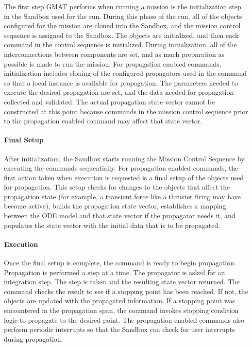\documentclass[10pt]{article}
\begin{document}
The first step GMAT performs when running a mission is the initialization step in the Sandbox used
for the run.  During this phase of the run, all of the objects configured for the mission are cloned
into the Sandbox, and the mission control sequence is assigned to the Sandbox.  The objects are
initialized, and then each command in the control sequence is initialized.  During initialization,
all of the interconnections between components are set, and as much preparation as possible is made
to run the mission.  For propagation enabled commands, initialization includes cloning of the
configured propagators used in the command so that a local instance is available for propagation.
The parameters needed to execute the desired propagation are set, and the data needed for
propagation collected and validated.  The actual propagation state vector cannot be constructed at
this point because commands in the mission control sequence prior to the propagation enabled command
may affect that state vector.

\paragraph{Final Setup}

After initialization, the Sandbox starts running the Mission Control Sequence by executing the
commands sequentially.  For propagation enabled commands, the first action taken when execution is
requested is a final setup of the objects used for propagation.  This setup checks for changes to
the objects that affect the propagation state (for example, a transient force like a thruster firing
may have become active), builds the propagation state vector, establishes a mapping between the ODE
model and that state vector if the propagator needs it, and populates the state vector with the
initial data that is to be propagated.

\paragraph{Execution}

Once the final setup is complete, the command is ready to begin propagation.  Propagation is
performed a step at a time.  The propagator is asked for an integration step.  The step is taken and
the resulting state vector returned.  The command checks the result to see if a stopping point has
been reached.  If not, the objects are updated with the propagated information.  If a stopping point
was encountered in the propagation span, the command invokes stopping condition logic to propagate
to the desired point.  The propagation enabled commands also perform periodic interrupts so that the
Sandbox can check for user interrupts during propagation.
\end{document}
